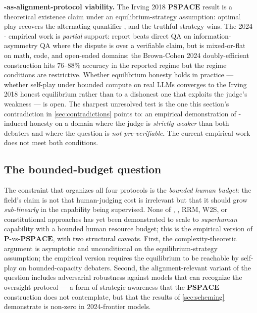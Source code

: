 \begin{contradiction}
\textbf{-as-alignment-protocol viability.} The Irving 2018
$\mathbf{PSPACE}$ result \citep[Theorem 1]{irving2018-debate} is a
theoretical existence claim under an equilibrium-strategy assumption:
optimal play recovers the alternating-quantifier , and the
truthful strategy wins. The 2024 - empirical work is
\emph{partial} support: \citet{kenton2024-debate-llm-judges} report
 beats direct QA on information-asymmetry QA where the dispute
is over a verifiable claim, but is mixed-or-flat on math, code, and
open-ended domains; the Brown-Cohen 2024 doubly-efficient construction
 hits $76$--$88\%$ accuracy in the reported regime
but the regime conditions are restrictive. Whether equilibrium
honesty holds in practice --- whether self-play under bounded compute
on real LLMs converges to the Irving 2018 honest equilibrium rather %
than to a dishonest one that exploits the judge's weakness --- is
open. The sharpest unresolved test is the one this section's
contradiction in \cref{sec:contradictions} points to: an empirical
demonstration of -induced honesty on a domain where the judge
is \emph{strictly weaker} than both debaters and where the question
is \emph{not pre-verifiable}. The current empirical work does not
meet both conditions.
\end{contradiction}

\subsection{The bounded-budget question}
\label{sec:oversight-bounded-budget}

The constraint that organizes all four protocols is the
\emph{bounded human budget}: the field's claim is not that
human-judging cost is irrelevant but that it should grow
\emph{sub-linearly} in the capability being supervised. None of ,
, RRM, W2S, or constitutional approaches has yet been demonstrated
to scale to \emph{superhuman} capability with a bounded human resource
budget; this is the empirical version of
$\mathbf{P}$-vs-$\mathbf{PSPACE}$, with two structural caveats. First,
the complexity-theoretic argument is asymptotic and unconditional on
the equilibrium-strategy assumption; the empirical version requires
the equilibrium to be reachable by self-play on bounded-capacity
debaters. Second, the alignment-relevant variant of the question
includes adversarial robustness against models that can recognize the
oversight protocol --- a form of strategic awareness that the
$\mathbf{PSPACE}$ construction does not contemplate, but that the
 results of \cref{sec:scheming} demonstrate is non-zero in
2024-frontier models.

